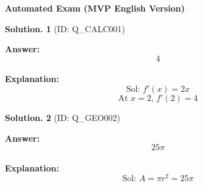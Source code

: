 \documentclass[12pt, a4paper]{article}
\begin{document}
\begin{center}
    \textbf{\Large Automated Exam (MVP English Version)} 
\end{center}
\vspace{0.5cm}

\vspace{0.5cm}
\noindent\textbf{\large Solution. 1} (ID: Q_CALC001)
\par
\textbf{Answer:} $$4$$ \\ 
\textbf{Explanation:} $$\text{Sol: } f'(x) = 2x$$$$\text{At } x=2 \text{, } f'(2) = 4$$
\vspace{0.5cm}


\vspace{0.5cm}
\noindent\textbf{\large Solution. 2} (ID: Q_GEO002)
\par
\textbf{Answer:} $$25\pi$$ \\ 
\textbf{Explanation:} $$\text{Sol: } A = \pi r^2 = 25\pi$$
\vspace{0.5cm}
\end{document}
